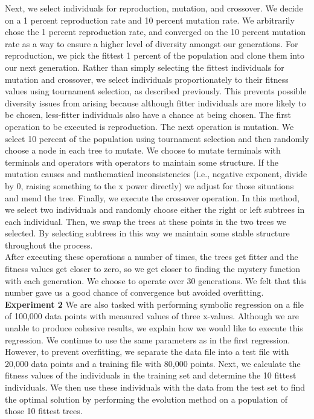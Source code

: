 Next, we select individuals for reproduction, mutation, and crossover. We decide on a 1 percent reproduction rate and 10 percent mutation rate. We arbitrarily chose the 1 percent reproduction rate, and converged on the 10 percent mutation rate as a way to ensure a higher level of diversity amongst our generations. For reproduction, we pick the fittest 1 percent of the population and clone them into our next generation. Rather than simply selecting the fittest individuals for mutation and crossover, we select individuals proportionately to their fitness values using tournament selection, as described previously. This prevents possible diversity issues from arising because although fitter individuals are more likely to be chosen, less-fitter individuals also have a chance at being chosen. The first operation to be executed is reproduction. The next operation is mutation. We select 10 percent of the population using tournament selection and then randomly choose a node in each tree to mutate. We choose to mutate terminals with terminals and operators with operators to maintain some structure. If the mutation causes and mathematical inconsistencies (i.e., negative exponent, divide by 0, raising something to the x power directly) we adjust for those situations and mend the tree. Finally, we execute the crossover operation. In this method, we select two individuals and randomly choose either the right or left subtrees in each individual. Then, we swap the trees at these points in the two trees we selected.  By selecting subtrees in this way we maintain some stable structure throughout the process.\\

After executing these operations a number of times, the trees get fitter and the fitness values get closer to zero, so we get closer to finding the mystery function with each generation. We choose to operate over 30 generations. We felt that this number gave us a good chance of convergence but avoided overfitting.\\

\textbf{Experiment 2}
We are also tasked with performing symbolic regression on a file of 100,000 data points with measured values of three x-values. Although we are unable to produce cohesive results, we explain how we would like to execute this regression. We continue to use the same parameters as in the first regression. However, to prevent overfitting, we separate the data file into a test file with 20,000 data points and a training file with 80,000 points. Next, we calculate the fitness values of the individuals in the training set and determine the 10 fittest individuals. We then use these individuals with the data from the test set to find the optimal solution by performing the evolution method on a population of those 10 fittest trees. 

